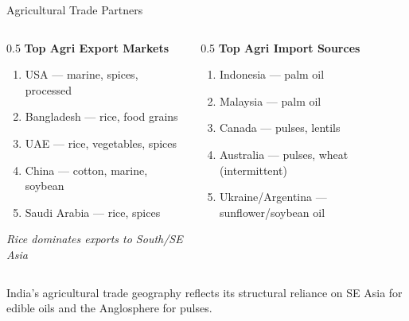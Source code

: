 \documentclass[
  ignorenonframetext,
  aspectratio=169,
]{beamer}
\makeatletter
\providecommand{\tightlist}{%
  \setlength{\itemsep}{0pt}\setlength{\parskip}{0pt}}
\let\quarto@originallabel\label
\DeclareRobustCommand*{\label}[1]{\quarto@originallabel{#1}}
\makeatother
\begin{document}
\begin{frame}{Agricultural Trade Partners}
\label{agricultural-trade-partners}
\begin{columns}[T]
\begin{column}{0.5\linewidth}
\textbf{Top Agri Export Markets}

\begin{enumerate}
\tightlist
\item
  USA --- marine, spices, processed
\item
  Bangladesh --- rice, food grains
\item
  UAE --- rice, vegetables, spices
\item
  China --- cotton, marine, soybean
\item
  Saudi Arabia --- rice, spices
\end{enumerate}

\emph{Rice dominates exports to South/SE Asia}
\end{column}

\begin{column}{0.5\linewidth}
\textbf{Top Agri Import Sources}

\begin{enumerate}
\tightlist
\item
  Indonesia --- palm oil
\item
  Malaysia --- palm oil
\item
  Canada --- pulses, lentils
\item
  Australia --- pulses, wheat (intermittent)
\item
  Ukraine/Argentina --- sunflower/soybean oil
\end{enumerate}
\end{column}
\end{columns}

India's agricultural trade geography reflects its structural reliance on
SE Asia for edible oils and the Anglosphere for pulses.
\end{frame}
\end{document}
